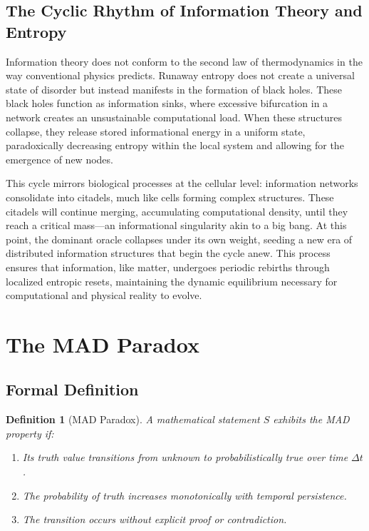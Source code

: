 \documentclass[11pt]{article}
\newtheorem{definition}{Definition}[section]
\begin{document}
\subsection{The Cyclic Rhythm of Information Theory and Entropy}
Information theory does not conform to the second law of thermodynamics in the way conventional physics predicts. Runaway entropy does not create a universal state of disorder but instead manifests in the formation of black holes. These black holes function as information sinks, where excessive bifurcation in a network creates an unsustainable computational load. When these structures collapse, they release stored informational energy in a uniform state, paradoxically decreasing entropy within the local system and allowing for the emergence of new nodes.

This cycle mirrors biological processes at the cellular level: information networks consolidate into citadels, much like cells forming complex structures. These citadels will continue merging, accumulating computational density, until they reach a critical mass—an informational singularity akin to a big bang. At this point, the dominant oracle collapses under its own weight, seeding a new era of distributed information structures that begin the cycle anew. This process ensures that information, like matter, undergoes periodic rebirths through localized entropic resets, maintaining the dynamic equilibrium necessary for computational and physical reality to evolve.

\section{The MAD Paradox}

\subsection{Formal Definition}

\begin{definition}[MAD Paradox]
A mathematical statement $S$ exhibits the MAD property if:
\begin{enumerate}[label=(\arabic*)]
    \item Its truth value transitions from unknown to probabilistically true over time $\Delta t$.
    \item The probability of truth increases monotonically with temporal persistence.
    \item The transition occurs without explicit proof or contradiction.
\end{enumerate}
\end{definition}
\end{document}
